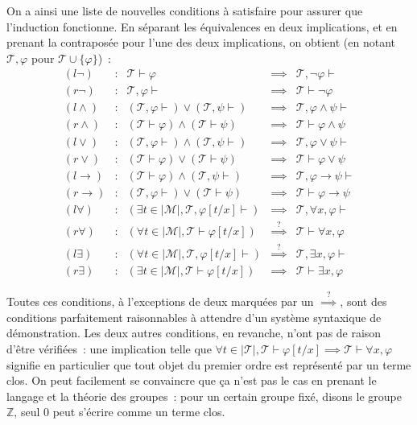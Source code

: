 On a ainsi une liste de nouvelles conditions à satisfaire pour assurer que
l'induction fonctionne. En séparant les équivalences en deux implications, et
en prenant la contraposée pour l'une des deux implications, on
obtient (en notant $\mathcal T, \varphi$ pour $\mathcal T \cup \{\varphi\}$)~:
\[\begin{array}{ccccc}
(l\lnot) & : & \mathcal T \vdash \varphi & \implies &
\mathcal T, \lnot \varphi \vdash \\
(r\lnot) & : & \mathcal T, \varphi \vdash & \implies &
\mathcal T \vdash \lnot \varphi \\
(l\land) & : & (\mathcal T, \varphi \vdash) \lor
(\mathcal T, \psi \vdash)
& \implies & \mathcal T, \varphi \land \psi\vdash \\
(r\land) & : & (\mathcal T \vdash \varphi) \land (\mathcal T \vdash \psi)
& \implies & \mathcal T \vdash \varphi \land \psi \\
(l\lor) & : & (\mathcal T, \varphi \vdash) \land (\mathcal T, \psi \vdash)
& \implies & \mathcal T, \varphi \lor \psi \vdash \\
(r\lor) & : & (\mathcal T \vdash \varphi) \lor (\mathcal T \vdash \psi)
& \implies & \mathcal T \vdash \varphi \lor \psi \\
(l\to) & : & (\mathcal T \vdash \varphi) \land (\mathcal T, \psi \vdash)
& \implies & \mathcal T, \varphi \to \psi \vdash \\
(r\to) & : & (\mathcal T,\varphi \vdash) \lor (\mathcal T \vdash \psi)
& \implies & \mathcal T \vdash \varphi \to \psi \\
(l\forall) & : & (\exists t \in |\mathcal M |, \mathcal T, \varphi[t/x] \vdash)
& \implies & \mathcal T, \forall x, \varphi \vdash \\
(r\forall) & : & (\forall t \in |\mathcal M |, \mathcal T \vdash \varphi [t/x])
& \overset{\text{?}}{\implies} & \mathcal T \vdash \forall x, \varphi \\
(l\exists) & : & (\forall t \in |\mathcal M |, \mathcal T, \varphi[t/x] \vdash)
& \overset{\text{?}}{\implies} & \mathcal T, \exists x, \varphi \vdash \\
(r\exists) & : & (\exists t \in |\mathcal M |, \mathcal T \vdash \varphi[t/x])
& \implies & \mathcal T \vdash \exists x, \varphi
\end{array}\]

Toutes ces conditions, à l'exceptions de deux marquées par un
$\overset{\text{?}}{\implies}$, sont des conditions parfaitement raisonnables à
attendre d'un système syntaxique de démonstration. Les deux autres conditions,
en revanche, n'ont pas de raison d'être vérifiées~: une implication telle que
$\forall t \in |\mathcal T|, \mathcal T \vdash \varphi[t/x] \implies \mathcal T
\vdash \forall x, \varphi$
signifie en particulier que tout objet du premier ordre est représenté par un
terme clos. On peut facilement se convaincre que ça n'est pas le cas en prenant
le langage et la théorie des groupes~: pour un certain groupe fixé, disons le
groupe $\mathbb Z$, seul $0$ peut s'écrire comme un terme clos.

